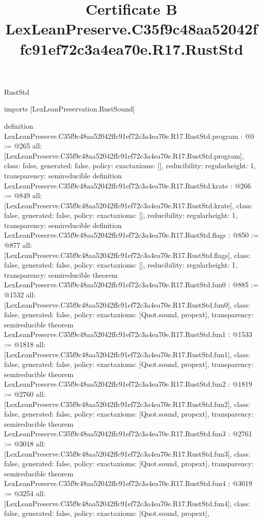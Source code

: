 \begin{lexlean}{RustStd}
\title{Certificate B LexLeanPreserve.C35f9c48aa52042ffc91ef72c3a4ea70e.R17.RustStd}
\begin{coremodule}
imports [LexLeanPreservation.RustSound]

definition LexLeanPreserve.C35f9c48aa52042ffc91ef72c3a4ea70e.R17.RustStd.program : @0 := @265 {
  all: [LexLeanPreserve.C35f9c48aa52042ffc91ef72c3a4ea70e.R17.RustStd.program],
  class: false,
  generated: false,
  policy: exact{axioms: []},
  reducibility: regular{height: 1},
  transparency: semireducible
}
definition LexLeanPreserve.C35f9c48aa52042ffc91ef72c3a4ea70e.R17.RustStd.krate : @266 := @849 {
  all: [LexLeanPreserve.C35f9c48aa52042ffc91ef72c3a4ea70e.R17.RustStd.krate],
  class: false,
  generated: false,
  policy: exact{axioms: []},
  reducibility: regular{height: 1},
  transparency: semireducible
}
definition LexLeanPreserve.C35f9c48aa52042ffc91ef72c3a4ea70e.R17.RustStd.flags : @850 := @877 {
  all: [LexLeanPreserve.C35f9c48aa52042ffc91ef72c3a4ea70e.R17.RustStd.flags],
  class: false,
  generated: false,
  policy: exact{axioms: []},
  reducibility: regular{height: 1},
  transparency: semireducible
}
theorem LexLeanPreserve.C35f9c48aa52042ffc91ef72c3a4ea70e.R17.RustStd.fun0 : @885 := @1532 {
  all: [LexLeanPreserve.C35f9c48aa52042ffc91ef72c3a4ea70e.R17.RustStd.fun0],
  class: false,
  generated: false,
  policy: exact{axioms: [Quot.sound, propext]},
  transparency: semireducible
}
theorem LexLeanPreserve.C35f9c48aa52042ffc91ef72c3a4ea70e.R17.RustStd.fun1 : @1533 := @1818 {
  all: [LexLeanPreserve.C35f9c48aa52042ffc91ef72c3a4ea70e.R17.RustStd.fun1],
  class: false,
  generated: false,
  policy: exact{axioms: [Quot.sound, propext]},
  transparency: semireducible
}
theorem LexLeanPreserve.C35f9c48aa52042ffc91ef72c3a4ea70e.R17.RustStd.fun2 : @1819 := @2760 {
  all: [LexLeanPreserve.C35f9c48aa52042ffc91ef72c3a4ea70e.R17.RustStd.fun2],
  class: false,
  generated: false,
  policy: exact{axioms: [Quot.sound, propext]},
  transparency: semireducible
}
theorem LexLeanPreserve.C35f9c48aa52042ffc91ef72c3a4ea70e.R17.RustStd.fun3 : @2761 := @3018 {
  all: [LexLeanPreserve.C35f9c48aa52042ffc91ef72c3a4ea70e.R17.RustStd.fun3],
  class: false,
  generated: false,
  policy: exact{axioms: [Quot.sound, propext]},
  transparency: semireducible
}
theorem LexLeanPreserve.C35f9c48aa52042ffc91ef72c3a4ea70e.R17.RustStd.fun4 : @3019 := @3254 {
  all: [LexLeanPreserve.C35f9c48aa52042ffc91ef72c3a4ea70e.R17.RustStd.fun4],
  class: false,
  generated: false,
  policy: exact{axioms: [Quot.sound, propext]},
}
\end{coremodule}
\end{lexlean}
